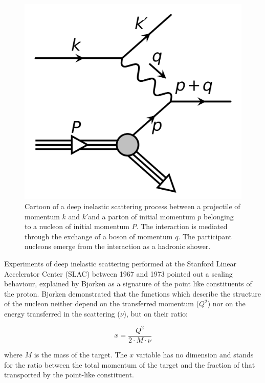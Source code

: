 \begin{figure}[!ht]
\begin{center}
\includegraphics[width=0.5\linewidth]{Chapters/Introduction/Figs/DIS.pdf}
\caption{Cartoon of a deep inelastic scattering process between a projectile of momentum $k$ and $k'$and a parton of initial momentum $p$ belonging to a nucleon of initial momentum $P$. The interaction is mediated through the exchange of a boson of momentum $q$. The participant nucleons emerge from the interaction as a hadronic shower.}
\label{fig:DIS}
\end{center}
\end{figure}

Experiments of deep inelastic scattering performed at the Stanford Linear Accelerator Center (SLAC) between 1967 and 1973 pointed out a scaling behaviour, explained by Bjorken as a signature of the point like constituents of the proton.
Bjorken demonstrated that the functions which describe the structure of the nucleon neither depend on the transferred momentum ($Q^2$) nor on the energy transferred in the scattering ($\nu$), but on their ratio:

\begin{equation}
    x = \frac{Q^2}{2\cdot M \cdot \nu}
\end{equation}

where $M$ is the mass of the target.
The $x$ variable has no dimension and stands for the ratio between the total momentum of the target and the fraction of that transported by the point-like constituent.


